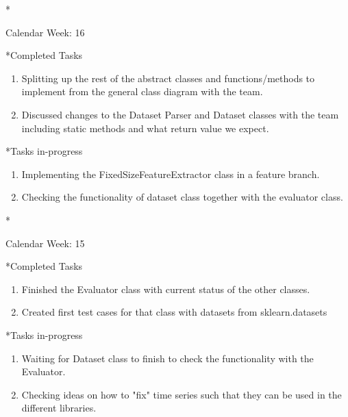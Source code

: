 \documentclass[11pt,a4paper]{article}
\begin{document}
\newpage
\begin{section}*{Calendar Week: 16 \hfill \date{23 April, 2021}}
	
	\begin{subsection}*{Completed Tasks}
		\begin{enumerate}
			\item Splitting up the rest of the abstract classes and functions/methods to implement from the general class diagram with the team.
			\item Discussed changes to the Dataset Parser and Dataset classes with the team including static methods and what return value we expect.
		\end{enumerate}
	\end{subsection}
	
	\begin{subsection}*{Tasks in-progress}
		\begin{enumerate}
			\item Implementing the FixedSizeFeatureExtractor class in a feature branch.
			\item Checking the functionality of dataset class together with the evaluator class.
		\end{enumerate}
	\end{subsection}
	
\end{section}

\newpage
\begin{section}*{Calendar Week: 15 \hfill \date{16 April, 2021}}
	
	\begin{subsection}*{Completed Tasks}
		\begin{enumerate}
			\item Finished the Evaluator class with current status of the other classes.
			\item Created first test cases for that class with datasets from sklearn.datasets
		\end{enumerate}
	\end{subsection}
	
	\begin{subsection}*{Tasks in-progress}
		\begin{enumerate}
			\item Waiting for Dataset class to finish to check the functionality with the Evaluator.
			\item Checking ideas on how to "fix" time series such that they can be used in the different libraries.
		\end{enumerate}
	\end{subsection}
	
\end{section}
\end{document}
